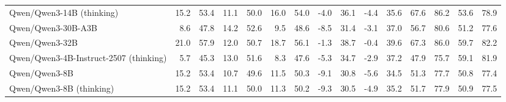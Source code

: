 \documentclass{article}
\begin{document}
\begin{table}[htbp]
\begin{threeparttable}
\begin{adjustbox}{max width=\textwidth}
\begin{tabular}{lrrrrrrrrrrrrrr}
Qwen/Qwen3-14B (thinking) & \cellcolor[HTML]{FBE5DB}15.2 & \cellcolor[HTML]{FCEBE3}53.4 & \cellcolor[HTML]{FEFEFE}11.1 & \cellcolor[HTML]{FCFDFE}50.0 & \cellcolor[HTML]{FDF1EC}16.0 & \cellcolor[HTML]{FEFAF8}54.0 & \cellcolor[HTML]{F8CDB9}-4.0 & \cellcolor[HTML]{F9D6C6}36.1 & \cellcolor[HTML]{F7BEA4}-4.4 & \cellcolor[HTML]{F7BFA6}35.6 & \cellcolor[HTML]{D1E6F1}67.6 & \cellcolor[HTML]{C2DEEC}86.2 & \cellcolor[HTML]{DFEEF5}53.6 & \cellcolor[HTML]{CFE5F0}78.9 \\
Qwen/Qwen3-30B-A3B & \cellcolor[HTML]{F6B89C}8.6 & \cellcolor[HTML]{F6BAA0}47.8 & \cellcolor[HTML]{B7D8E9}14.2 & \cellcolor[HTML]{B5D8E8}52.6 & \cellcolor[HTML]{F9CFBD}9.5 & \cellcolor[HTML]{FAD6C6}48.6 & \cellcolor[HTML]{F6BBA1}-8.5 & \cellcolor[HTML]{F7C1A9}31.4 & \cellcolor[HTML]{FADCCE}-3.1 & \cellcolor[HTML]{FADDD0}37.0 & \cellcolor[HTML]{F0F7FA}56.7 & \cellcolor[HTML]{DEEDF5}80.6 & \cellcolor[HTML]{E7F2F7}51.2 & \cellcolor[HTML]{D6E9F2}77.6 \\
Qwen/Qwen3-32B & \cellcolor[HTML]{EFF6FA}21.0 & \cellcolor[HTML]{E7F2F7}57.9 & \cellcolor[HTML]{EAF4F8}12.0 & \cellcolor[HTML]{E7F2F7}50.7 & \cellcolor[HTML]{FDFEFE}18.7 & \cellcolor[HTML]{F3F9FB}56.1 & \cellcolor[HTML]{FAD7C7}-1.3 & \cellcolor[HTML]{FBE1D6}38.7 & \cellcolor[HTML]{E0EEF5}-0.4 & \cellcolor[HTML]{DEEDF5}39.6 & \cellcolor[HTML]{D2E7F1}67.3 & \cellcolor[HTML]{C3DFEC}86.0 & \cellcolor[HTML]{CCE4EF}59.7 & \cellcolor[HTML]{BFDDEB}82.2 \\
Qwen/Qwen3-4B-Instruct-2507 (thinking) & \cellcolor[HTML]{F4A582}5.7 & \cellcolor[HTML]{F4A582}45.3 & \cellcolor[HTML]{D2E7F1}13.0 & \cellcolor[HTML]{D0E6F0}51.6 & \cellcolor[HTML]{F8C9B4}8.3 & \cellcolor[HTML]{F9CFBC}47.6 & \cellcolor[HTML]{F8C7B2}-5.3 & \cellcolor[HTML]{F9D0BD}34.7 & \cellcolor[HTML]{FBE1D5}-2.9 & \cellcolor[HTML]{FBE2D8}37.2 & \cellcolor[HTML]{FDF5F2}47.9 & \cellcolor[HTML]{F7FAFC}75.7 & \cellcolor[HTML]{CEE5F0}59.1 & \cellcolor[HTML]{C1DEEC}81.9 \\
Qwen/Qwen3-8B & \cellcolor[HTML]{FBE5DB}15.2 & \cellcolor[HTML]{FCEBE3}53.4 & \cellcolor[HTML]{FDF6F3}10.7 & \cellcolor[HTML]{FEF8F6}49.6 & \cellcolor[HTML]{FADACC}11.5 & \cellcolor[HTML]{FBE1D6}50.3 & \cellcolor[HTML]{F6B99E}-9.1 & \cellcolor[HTML]{F7BEA6}30.8 & \cellcolor[HTML]{F4A582}-5.6 & \cellcolor[HTML]{F4A582}34.5 & \cellcolor[HTML]{FEFEFD}51.3 & \cellcolor[HTML]{EDF5F9}77.7 & \cellcolor[HTML]{E8F3F8}50.8 & \cellcolor[HTML]{D7EAF3}77.4 \\
Qwen/Qwen3-8B (thinking) & \cellcolor[HTML]{FBE5DB}15.2 & \cellcolor[HTML]{FCEBE3}53.4 & \cellcolor[HTML]{FEFEFE}11.1 & \cellcolor[HTML]{FCFDFE}50.0 & \cellcolor[HTML]{FAD9CA}11.3 & \cellcolor[HTML]{FBE0D4}50.2 & \cellcolor[HTML]{F6B89D}-9.3 & \cellcolor[HTML]{F7BDA4}30.5 & \cellcolor[HTML]{F5B496}-4.9 & \cellcolor[HTML]{F5B497}35.2 & \cellcolor[HTML]{FEFEFE}51.7 & \cellcolor[HTML]{ECF4F9}77.9 & \cellcolor[HTML]{E8F2F8}50.9 & \cellcolor[HTML]{D7EAF3}77.5 \\

\end{tabular}
\end{adjustbox}
\end{threeparttable}
\end{table}
\end{document}
